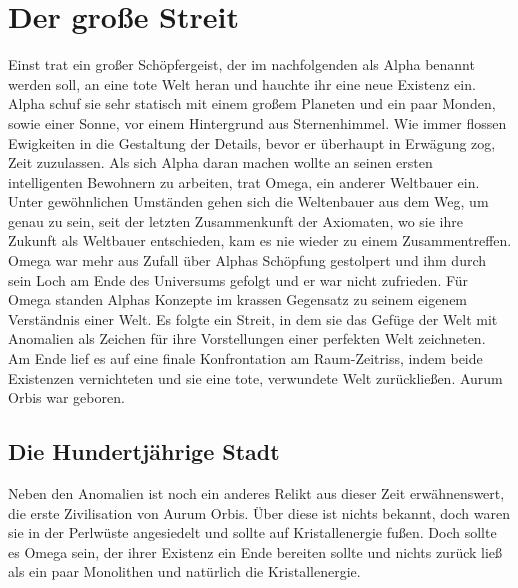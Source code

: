 \documentclass[a4paper,12pt,oneside]{book}
\begin{document}
\section{Der große Streit}
Einst trat ein großer Schöpfergeist, der im nachfolgenden als Alpha benannt werden soll, an eine tote Welt heran und hauchte ihr eine neue Existenz ein. Alpha schuf sie sehr statisch mit einem großem Planeten und ein paar Monden, sowie einer Sonne, vor einem Hintergrund aus Sternenhimmel. Wie immer flossen Ewigkeiten in die Gestaltung der Details, bevor er überhaupt in Erwägung zog, Zeit zuzulassen. Als sich Alpha daran machen wollte an seinen ersten intelligenten Bewohnern zu arbeiten, trat Omega, ein anderer Weltbauer ein.
\\ Unter gewöhnlichen Umständen gehen sich die Weltenbauer aus dem Weg, um genau zu sein, seit der letzten Zusammenkunft der Axiomaten, wo sie ihre Zukunft als Weltbauer entschieden, kam es nie wieder zu einem Zusammentreffen. Omega war mehr aus Zufall über Alphas Schöpfung gestolpert und ihm durch sein Loch am Ende des Universums gefolgt und er war nicht zufrieden. Für Omega standen Alphas Konzepte im krassen Gegensatz zu seinem eigenem Verständnis einer Welt. Es folgte ein Streit, in dem sie das Gefüge der Welt mit Anomalien als Zeichen für ihre Vorstellungen einer perfekten Welt zeichneten.
\\ Am Ende lief es auf eine finale Konfrontation am Raum-Zeitriss, indem beide Existenzen vernichteten und sie eine tote, verwundete Welt zurückließen. Aurum Orbis war geboren.
\subsection{Die Hundertjährige Stadt}
Neben den Anomalien ist noch ein anderes Relikt aus dieser Zeit erwähnenswert, die erste Zivilisation von Aurum Orbis. Über diese ist nichts bekannt, doch waren sie in der Perlwüste angesiedelt und sollte auf Kristallenergie fußen. Doch sollte es Omega sein, der ihrer Existenz ein Ende bereiten sollte und nichts zurück ließ als ein paar Monolithen und natürlich die Kristallenergie.
\end{document}
